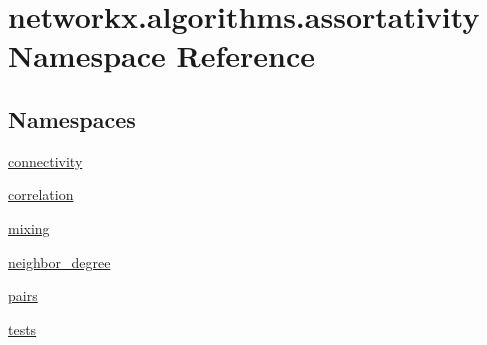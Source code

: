 \hypertarget{namespacenetworkx_1_1algorithms_1_1assortativity}{}\section{networkx.\+algorithms.\+assortativity Namespace Reference}
\label{namespacenetworkx_1_1algorithms_1_1assortativity}
\subsection*{Namespaces}
\begin{DoxyCompactItemize}
\item 
 \hyperlink{namespacenetworkx_1_1algorithms_1_1assortativity_1_1connectivity}{connectivity}
\item 
 \hyperlink{namespacenetworkx_1_1algorithms_1_1assortativity_1_1correlation}{correlation}
\item 
 \hyperlink{namespacenetworkx_1_1algorithms_1_1assortativity_1_1mixing}{mixing}
\item 
 \hyperlink{namespacenetworkx_1_1algorithms_1_1assortativity_1_1neighbor__degree}{neighbor\+\_\+degree}
\item 
 \hyperlink{namespacenetworkx_1_1algorithms_1_1assortativity_1_1pairs}{pairs}
\item 
 \hyperlink{namespacenetworkx_1_1algorithms_1_1assortativity_1_1tests}{tests}
\end{DoxyCompactItemize}
